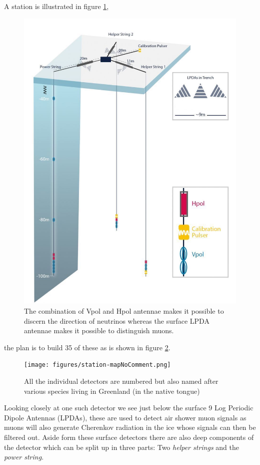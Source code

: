 A station is illustrated in figure \ref{fig:detector}, 
\begin{figure}
	\centering
	\includegraphics[height=0.4\textheight]{figures/RNO-G_station_sketch.jpg}	
	\caption{The combination of Vpol and Hpol antennae makes it possible to discern the direction of neutrinos whereas
	the surface LPDA antennae makes it possible to distinguish muons.}
	\label{fig:detector}
\end{figure}
the plan is to build 35 of these as is shown in figure \ref{fig:station map}. 
\begin{figure}
	\centering
	\texttt{[image: figures/station-mapNoComment.png]}	
	\caption{All the individual detectors are numbered but also named after various species living in
Greenland (in the native tongue)}
	\label{fig:station map}
\end{figure}
Looking closely at one such detector we see
just below the surface 9 Log Periodic Dipole Antennas (LPDAs), these are used
to detect air shower muon signals as muons will also generate Cherenkov
radiation in the ice whose signals can then be filtered out.  Aside form these
surface detectors there are also deep components of the detector which can be
split up in three parts: Two \textit{helper strings} and the \textit{power
string}.

